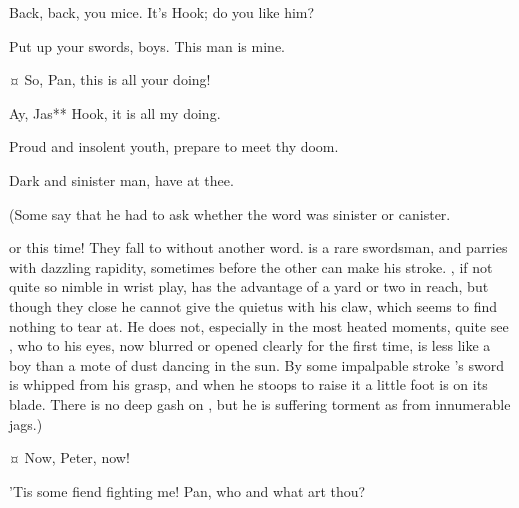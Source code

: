 \begin{drama}

\hookspeaks
Back, back, you mice.
It’s Hook; do you like him?

\peterspeaks
Put up your swords, boys.
This man is mine.


\hookspeaks {}¤
So, Pan, this is all your doing!

\peterspeaks
Ay, Jas** Hook, it is all my doing.

\hookspeaks
Proud and insolent youth, prepare to meet thy doom.

\peterspeaks
Dark and sinister man, have at thee.

\begin{stagedir}
(Some say that he had to ask \tootles whether the word was sinister or canister.

\hook or \peter this time!
They fall to without another word.
\peter is a rare swordsman, and parries with dazzling rapidity,
sometimes before the other can make his stroke.
\hook, if not quite so nimble in wrist play, has the advantage of a yard or two in reach,
but though they close he cannot give the quietus with his claw, which seems to find nothing to tear at.
He does not, especially in the most heated moments, quite see \peter,
who to his eyes, now blurred or opened clearly for the first time,
is less like a boy than a mote of dust dancing in the sun.
By some impalpable stroke \hook’s sword is whipped from his grasp,
and when he stoops to raise it a little foot is on its blade.
There is no deep gash on \hook, but he is suffering torment as from innumerable jags.)
\end{stagedir}

 ¤
Now, Peter, now!


\hookspeaks
’Tis some fiend fighting me!
Pan, who and what art thou?


\end{drama}
